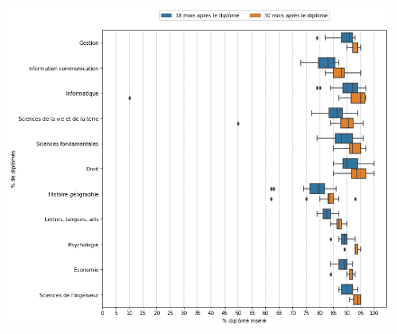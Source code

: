 \documentclass[12pt, a4paper, titlepage, table]{article}
\begin{document}
		\begin{figure}[H]
			\centering
			\includegraphics[width=1\textwidth]{../graphs/boxplot_insertion_discipline.png}
			\label{fig:boxplot_insertion_diplome}
		\end{figure}
		
\end{document}
